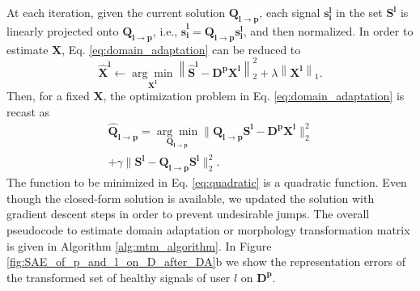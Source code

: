 \documentclass[journal,transmag]{IEEEtran}
\begin{document}
At each iteration, given the current solution $\bm{Q_{l \rightarrow p}}$, each signal $\bm{s_i^l}$ in the set $\bm{S^l}$ is linearly projected onto $\bm{Q_{l \rightarrow p}}$, i.e., $\bm{\widehat{s}^l_i} =\bm{Q_{l \rightarrow p}} \bm{s^l_i}$, and then normalized. In order to estimate $\bm{X}$, Eq. \eqref{eq:domain_adaptation} can be reduced to
\begin{equation}
    \bm{\hat{X}^l} \gets \underset{\bm{X^l}}{\arg\min} \left\| \bm{\widehat{S}^l} - \bm{D^p} \bm{X^l} \right\|_2^2 + \lambda \left\| \bm{X^l} \right\|_1.
\end{equation}
Then, for a fixed $\bm{X}$, the optimization problem in Eq. \eqref{eq:domain_adaptation} is recast as
\begin{multline}
    \bm{\hat{Q}_{l \rightarrow p}} = \underset{\bm{Q_{l \rightarrow p}}}{\arg\min} \|\bm{Q_{l \rightarrow p}S^l} - \bm{D^pX^l}\|_2^2 \\ + \gamma\|\bm{S^l} - \bm{Q_{l \rightarrow p}S^l}\|_2^2. \label{eq:quadratic}
\end{multline}
The function to be minimized in Eq. \eqref{eq:quadratic} is a quadratic function. Even though the closed-form solution is available, we updated the solution with gradient descent steps in order to prevent undesirable jumps. The overall pseudocode to estimate domain adaptation or morphology transformation
matrix is given in Algorithm \ref{alg:mtm_algorithm}. In Figure \ref{fig:SAE_of_p_and_l_on_D_after_DA}b we show the representation errors of the transformed set of healthy signals of user $l$ on $\bm{D^p}$.
\end{document}

